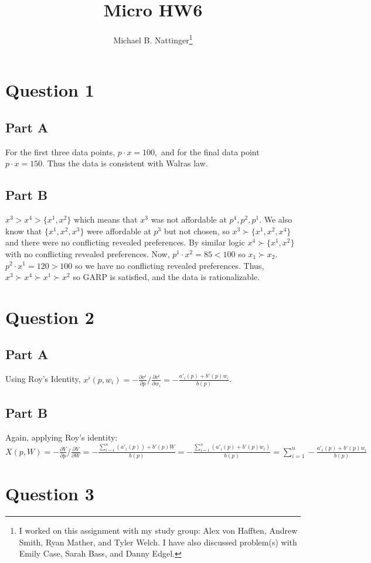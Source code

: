 \documentclass[11pt]{article} %
\title{Micro HW6}
\author{Michael B. Nattinger\footnote{I worked on this assignment with my study group: Alex von Hafften, Andrew Smith, Ryan Mather, and Tyler Welch. I have also discussed problem(s) with Emily Case, Sarah Bass, and Danny Edgel.}}
\begin{document}
\maketitle

\section{Question 1}
\subsection{Part A}
For the first three data points, $p \cdot x = 100,$ and for the final data point $p \cdot x = 150.$ Thus the data is consistent with Walras law.

\subsection{Part B}
$x^3>x^4>\{x^1,x^2\}$ which means that $x^3$ was not affordable at $p^4,p^2,p^1.$ We also know that $\{ x^1,x^2,x^3\}$ were affordable at $p^3$ but not chosen, so $x^3\succ \{x^1,x^2,x^4 \}$ and there were no conflicting revealed preferences. By similar logic $x^4 \succ \{x^1,x^2 \}$ with no conflicting revealed preferences. Now, $p^1\cdot x^2 = 85<100$ so $x_1 \succ x_2$. $p^2 \cdot x^1 = 120>100$ so we have no conflicting revealed preferences. Thus, $x^3\succ x^4 \succ x^1 \succ x^2$ so GARP is satisfied, and the data is rationalizable.

\section{Question 2}
\subsection{Part A}
Using Roy's Identity, $x^i(p,w_i) = -\frac{\partial v^i}{\partial p} /\frac{\partial v^i}{\partial w_i} = -\frac{a'_i(p) + b'(p)w_i}{b(p)}$.
\subsection{Part B}
 Again, applying Roy's identity: $X(p,W) = -\frac{\partial V}{\partial p} /\frac{\partial V}{\partial W} = -\frac{\sum_{i=1}^{n} (a'_i(p)) + b'(p)W}{b(p)} = -\frac{\sum_{i=1}^{n} (a'_i(p) + b'(p)w_i)}{b(p)} =\sum_{i=1}^n -\frac{a'_i(p) + b'(p)w_i}{b(p)}$
\section{Question 3}
\end{document}
